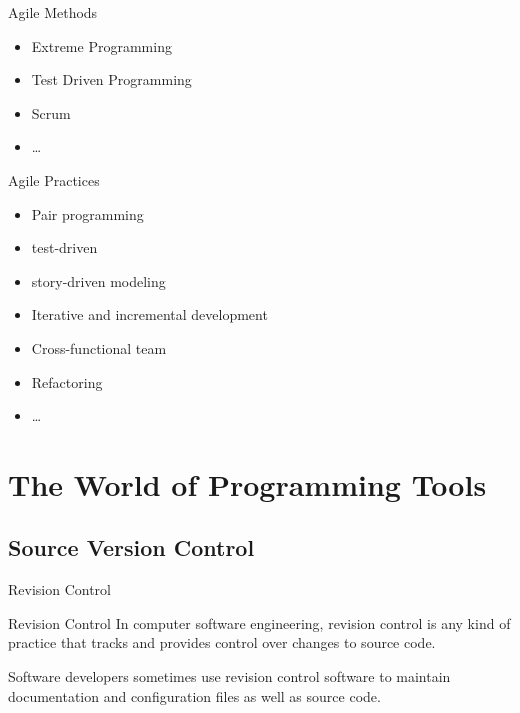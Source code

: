 \documentclass[UTF8]{beamer}
\begin{document}
\begin{frame}
  \begin{block}{Agile Methods}
    \begin{itemize}
      \item Extreme Programming
      \item Test Driven Programming
      \item Scrum
      \item \ldots
    \end{itemize}
  \end{block}
\end{frame}

\begin{frame}
  \begin{block}{Agile Practices}
    \begin{itemize}
      \item Pair programming
      \item test-driven
      \item story-driven modeling
      \item Iterative and incremental development
      \item Cross-functional team
      \item Refactoring
      \item \ldots
    \end{itemize}
  \end{block}
\end{frame}

\section{The World of Programming Tools}

\subsection{Source Version Control}

\begin{frame}[t]{Revision Control}
    \begin{block}{Revision Control}
        In computer software engineering, revision control is any kind of practice that tracks and provides control over changes to source code.

        Software developers sometimes use revision control software to maintain documentation and configuration files as well as source code.
    \end{block}
\end{frame}
\end{document}
